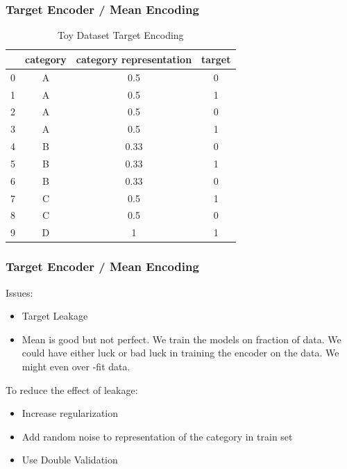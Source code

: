 \documentclass{beamer}
\begin{document}
    \begin{frame}
        \frametitle{Target Encoder / Mean Encoding}
        \begin{table}[htb]
            \begin{center}
            {\renewcommand{\arraystretch}{0.4}
            \renewcommand{\tabcolsep}{0.4cm}
                \begin{tabular}[c]{|c|c|c|c|}
                    \hline & \textbf{category} & \textbf{category representation} & \textbf{
                        target} \\
                    \hline
                    0 & A & 0.5    & 0 \\
                    \hline
                    1 & A & 0.5    & 1 \\
                    \hline
                    2 & A & 0.5    & 0 \\
                    \hline
                    3 & A & 0.5    & 1 \\
                    \hline
                    4 & B & 0.33 & 0 \\
                    \hline
                    5 & B & 0.33 & 1 \\
                    \hline
                    6 & B & 0.33 & 0 \\
                    \hline
                    7 & C & 0.5    & 1 \\
                    \hline
                    8 & C & 0.5    & 0 \\
                    \hline
                    9 & D & 1      & 1 \\
                    \hline
                \end{tabular}}
                \caption{Toy Dataset Target Encoding}
            \end{center}
        \end{table}
    \end{frame}

    \begin{frame}[fragile]
        \frametitle{Target Encoder / Mean Encoding}
        Issues:
        \begin{itemize}
            \item Target Leakage
            \pause
            \item Mean is good but not perfect. We train the models on fraction of data. We could
            have either luck or bad luck in training the encoder on the data. We might even over
            -fit data.
            \pause
        \end{itemize}
        To reduce the effect of leakage:
        \begin{itemize}
            \item Increase regularization
            \pause
            \item Add random noise to representation of the category in train set
            \pause
            \item Use Double Validation
        \end{itemize}
    \end{frame}
\end{document}
